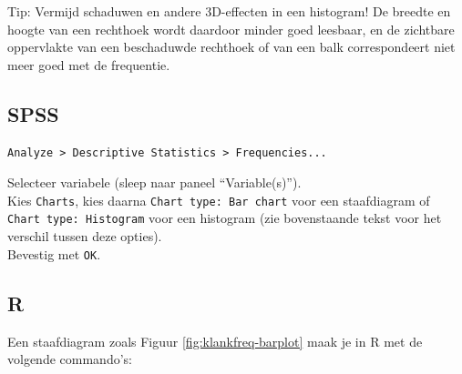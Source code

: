 \documentclass[
]{book}
\begin{document}
Tip: Vermijd schaduwen en andere 3D-effecten in een histogram! De
breedte en hoogte van een rechthoek wordt daardoor minder goed leesbaar,
en de zichtbare oppervlakte van een beschaduwde rechthoek of van een
balk correspondeert niet meer goed met de frequentie.

\hypertarget{spss-2}{%
\subsection{SPSS}\label{spss-2}}

\begin{verbatim}
Analyze > Descriptive Statistics > Frequencies...
\end{verbatim}

Selecteer variabele (sleep naar paneel ``Variable(s)'').\\
Kies \texttt{Charts}, kies daarna \texttt{Chart\ type:\ Bar\ chart} voor een
staafdiagram of \texttt{Chart\ type:\ Histogram} voor een histogram (zie
bovenstaande tekst voor het verschil tussen deze opties).\\
Bevestig met \texttt{OK}.\\

\hypertarget{r-2}{%
\subsection{R}\label{r-2}}

Een staafdiagram zoals Figuur \ref{fig:klankfreq-barplot} maak je in R met de volgende commando's:
\end{document}
